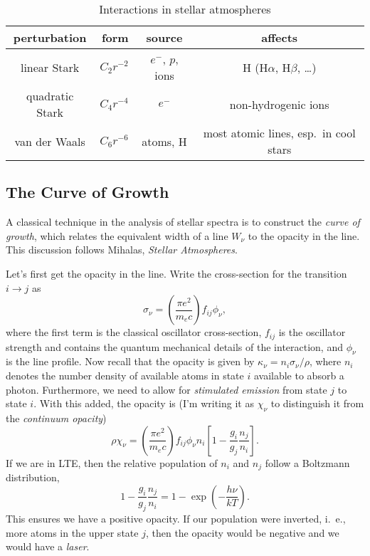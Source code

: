 \begin{table}[htbp]
\caption{Interactions in stellar atmospheres}\label{t.perturbers}
\begin{tabular}{crcc}
\hline
perturbation & form & source & affects\\
\hline\hline
linear Stark & $C_{2} r^{-2}$ & $e^{-}$, $p$, ions & H (H$\alpha$, H$\beta$, \ldots)\\
quadratic Stark & $C_{4} r^{-4}$ & $e^{-}$ & non-hydrogenic ions\\
van der Waals & $C_{6}r^{-6}$ & atoms, H & most atomic lines, esp.\ in cool stars\\
\hline
\end{tabular}
\end{table}


\subsection{The Curve of Growth}

A classical technique in the analysis of stellar spectra is to construct the \emph{curve of growth}, which relates the equivalent width of a line $W_{\nu}$ to the opacity in the line. This discussion follows Mihalas, \emph{Stellar Atmospheres}.

Let's first get the opacity in the line.  Write the cross-section for the transition $i\to j$ as 
\[
\sigma_{\nu} = \left(\frac{\pi e^{2}}{m_{e}c}\right)f_{ij}\phi_{\nu},
\]
where the first term is the classical oscillator cross-section, $f_{ij}$ is the oscillator strength and contains the quantum mechanical details of the interaction, and $\phi_{\nu}$ is the line profile.  Now recall that the opacity is given by $\kappa_{\nu} = n_{i}\sigma_{\nu}/\rho$, where $n_{i}$ denotes the number density of available atoms in state $i$ available to absorb a photon.  Furthermore, we need to allow for \emph{stimulated emission} from state $j$ to state $i$. With this added, the opacity is (I'm writing it as $\chi_{\nu}$ to distinguish it from the \emph{continuum opacity})
\begin{equation}\label{e.opacity}
\rho\chi_{\nu} = \left(\frac{\pi e^{2}}{m_{e}c}\right)f_{ij}\phi_{\nu}n_{i}\left[1 - \frac{g_{i}}{g_{j}}\frac{n_{j}}{n_{i}}\right].
\end{equation}
If we are in LTE, then the relative population of $n_{i}$ and $n_{j}$ follow a Boltzmann distribution,
\[ 1 - \frac{g_{i}}{g_{j}}\frac{n_{j}}{n_{i}} = 1- \exp\left(-\frac{h\nu}{kT}\right). \]
This ensures we have a positive opacity. If our population were inverted, i.~e., more atoms in the upper state $j$, then the opacity would be negative and we would have a \emph{laser}.


